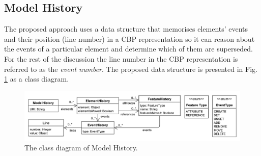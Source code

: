 \documentclass{llncs}
\begin{document}
% 

\subsection{Model History}
\label{subsec:model_history}
The proposed approach uses a data structure that memorises elements' events and their position (line number) in a CBP representation so it can reason about the events of a particular element and determine which of them are superseded.
For the rest of the discussion the line number in the CBP representation is referred to as the \emph{event number}.
The proposed data structure is presented in Fig. \ref{fig:object_history} as a class diagram.  


\begin{figure}[ht]
\centering
\includegraphics[width=\linewidth]{object_history}
\caption{The class diagram of Model History.}
\label{fig:object_history}
\end{figure}
\end{document}
